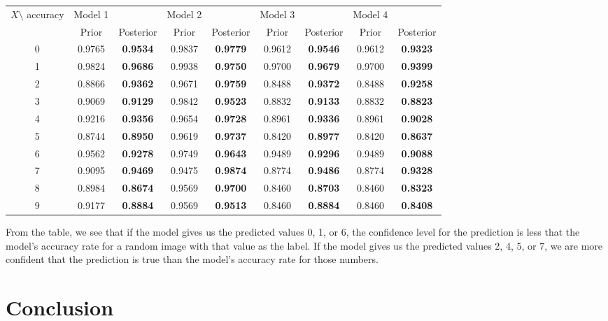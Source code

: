 \documentclass{article}
\begin{document}
\begin{center}
\bgroup
\def\arraystretch{1.2}
\begin{tabular}{c|cc|cc|cc|cc}
\hline
$X\setminus$ accuracy & Model 1 &       & Model 2 &       & Model 3 &       & Model 4 &    \\
                      & Prior  & Posterior & Prior  & Posterior & Prior  & Posterior & Prior  & Posterior \\
\hline
0 & 0.9765 & {\bf 0.9534} & 0.9837 & {\bf 0.9779} & 0.9612 & {\bf 0.9546} & 0.9612 & {\bf 0.9323}\\
\hline
1 & 0.9824 & {\bf 0.9686} & 0.9938 & {\bf 0.9750} & 0.9700 & {\bf 0.9679} & 0.9700 &  {\bf 0.9399}\\
\hline
2 & 0.8866 & {\bf 0.9362} & 0.9671 & {\bf 0.9759} & 0.8488 & {\bf 0.9372} & 0.8488 &  {\bf 0.9258}\\
\hline
3 & 0.9069 & {\bf 0.9129} & 0.9842 & {\bf 0.9523} & 0.8832 & {\bf 0.9133} & 0.8832 &  {\bf 0.8823}\\
\hline
4 & 0.9216 & {\bf 0.9356} & 0.9654 & {\bf 0.9728} & 0.8961 & {\bf 0.9336} & 0.8961 &  {\bf 0.9028}\\
\hline
5 & 0.8744 & {\bf 0.8950} & 0.9619 & {\bf 0.9737} & 0.8420 & {\bf 0.8977} & 0.8420 &  {\bf 0.8637}\\
\hline
6 & 0.9562 & {\bf 0.9278} & 0.9749 & {\bf 0.9643} & 0.9489 & {\bf 0.9296} & 0.9489 &  {\bf 0.9088}\\
\hline
7 & 0.9095 & {\bf 0.9469} & 0.9475 & {\bf 0.9874} & 0.8774 & {\bf 0.9486} & 0.8774 &  {\bf 0.9328}\\
\hline
8 & 0.8984 & {\bf 0.8674} & 0.9569 & {\bf 0.9700} & 0.8460 & {\bf 0.8703} & 0.8460 &  {\bf 0.8323}\\
\hline
9 & 0.9177 & {\bf 0.8884} & 0.9569 & {\bf 0.9513} & 0.8460 & {\bf 0.8884} & 0.8460 &  {\bf 0.8408}\\
\hline
\end{tabular}
\egroup
\end{center}
\bigskip

From the table, we see that if the model gives us the predicted values 0, 1, or 6, the confidence level for the prediction is less that the model's accuracy rate for a random image with that value as the label. If the model gives us the predicted values 2, 4, 5, or 7, we are more confident that the prediction is true than the model's accuracy rate for those numbers.

\section{Conclusion}
\end{document}

